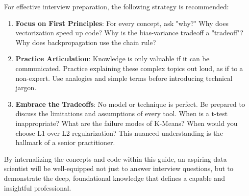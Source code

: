 \documentclass[11pt,a4paper]{article}
\begin{document}
For effective interview preparation, the following strategy is recommended:
\begin{enumerate}
    \item \textbf{Focus on First Principles}: For every concept, ask "why?" Why does vectorization speed up code? Why is the bias-variance tradeoff a "tradeoff"? Why does backpropagation use the chain rule?
    \item \textbf{Practice Articulation}: Knowledge is only valuable if it can be communicated. Practice explaining these complex topics out loud, as if to a non-expert. Use analogies and simple terms before introducing technical jargon.
    \item \textbf{Embrace the Tradeoffs}: No model or technique is perfect. Be prepared to discuss the limitations and assumptions of every tool. When is a t-test inappropriate? What are the failure modes of K-Means? When would you choose L1 over L2 regularization? This nuanced understanding is the hallmark of a senior practitioner.
\end{enumerate}

By internalizing the concepts and code within this guide, an aspiring data scientist will be well-equipped not just to answer interview questions, but to demonstrate the deep, foundational knowledge that defines a capable and insightful professional.
\end{document}
